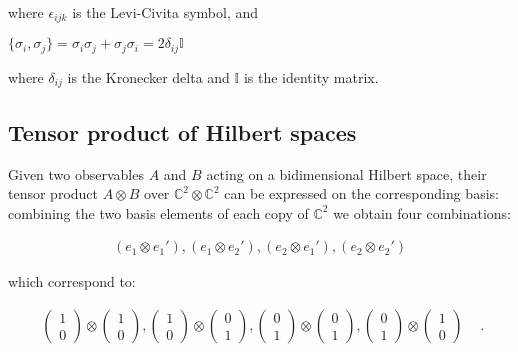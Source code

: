 \documentclass{Configuration_Files/PoliMi3i_thesis}
\begin{document}
where $\epsilon_{ijk}$ is the Levi-Civita symbol, and \newline


\begin{center}
	$\{\sigma_i, \sigma_j\} = \sigma_i \sigma_j + \sigma_j \sigma_i 
	= 2 \delta_{ij}\mathbb{I}$
\end{center}

where $ \delta_{ij} $ is the Kronecker delta and $\mathbb{I}$ is the identity matrix.


\subsection{Tensor product of Hilbert spaces}

Given two observables $A$ and $B$ acting on a bidimensional Hilbert space, their tensor product $A \otimes B$ over $\mathbb{C}^2 \otimes \mathbb{C}^2$ can be expressed on the corresponding basis: combining the two basis elements of each copy of $\mathbb{C}^2$ we  obtain four combinations:

\[\begin{array}{ccc}
	(e_1 \otimes e_1'), 
	(e_1 \otimes e_2'),
	(e_2 \otimes e_1'),
	(e_2 \otimes e_2')
\end{array}\]

which correspond to:

\[
\begin{array}{ccc}
	\begin{pmatrix}
		1 \\
		0  
	\end{pmatrix} 
	\otimes
	\begin{pmatrix}
		1  \\
		0 
	\end{pmatrix} ,
	
	\begin{pmatrix}
		1 \\
		0  
	\end{pmatrix} 
	\otimes
	\begin{pmatrix}
		0  \\
		1 
	\end{pmatrix} ,
	
	\begin{pmatrix}
		0 \\
		1  
	\end{pmatrix} 
	\otimes
	\begin{pmatrix}
		0  \\
		1 
	\end{pmatrix} ,
	
	\begin{pmatrix}
		0 \\
		1  
	\end{pmatrix} 
	\otimes
	\begin{pmatrix}
		1  \\
		0 
	\end{pmatrix} &
\end{array}.
\]
\end{document}
